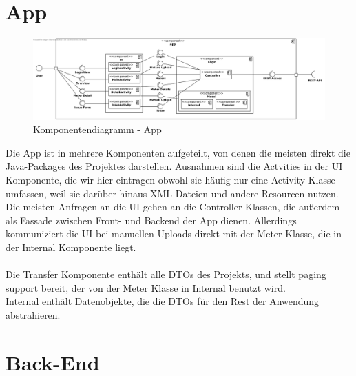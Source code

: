 \section{App}
\begin{figure}[h]
\includegraphics[scale=0.45]{img/diagrams/AppComponentDiagram}\caption{Komponentendiagramm - App}  
\end{figure} 
Die App ist in mehrere Komponenten aufgeteilt, von denen die meisten direkt die Java-Packages des Projektes darstellen. Ausnahmen sind die Actvities in der UI Komponente, die wir hier eintragen obwohl sie häufig nur eine Activity-Klasse umfassen, weil sie darüber hinaus XML Dateien und andere Resourcen nutzen.\\
Die meisten Anfragen an die UI gehen an die Controller Klassen, die außerdem als Fassade zwischen Front- und Backend der App dienen. Allerdings kommuniziert die UI bei manuellen Uploads direkt mit der Meter Klasse, die in der Internal Komponente liegt.\\ \\
Die Transfer Komponente enthält alle DTOs des Projekts, und stellt paging support bereit, der von der Meter Klasse in Internal benutzt wird.\\
Internal enthält Datenobjekte, die die DTOs für den Rest der Anwendung abstrahieren.
\section{Back-End}

